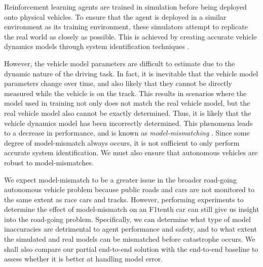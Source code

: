 

Reinforcement learning agents are trained in simulation before being deployed onto physical vehicles.
To ensure that the agent is deployed in a similar environment as its training environment, these simulators attempt to replicate the real world as closely as possible.
This is achieved by creating accurate vehicle dynamics models through system identification techniques \cite{Zhou2020}.

However, the vehicle model parameters are difficult to estimate due to the dynamic nature of the driving task.
In fact, it is inevitable that the vehicle model parameters change over time, and also likely that they cannot be directly measured while the vehicle is on the track.
This results in scenarios where the model used in training not only does not match the real vehicle model, but the real vehicle model also cannot be exactly determined.
Thus, it is likely that the vehicle dynamics model has been incorrectly determined. 
This phenomena leads to a decrease in performance, and is known as \emph{model-mismatching} \cite{Ghignone2022}.
Since some degree of model-mismatch always occurs, it is not sufficient to only perform accurate system identification.
We must also ensure that autonomous vehicles are robust to model-mismatches.

We expect model-mismatch to be a greater issue in the broader road-going autonomous vehicle problem because public roads and cars are not monitored to the same extent as race cars and tracks.
However, performing experiments to determine the effect of model-mismatch on an F1tenth car can still give us insight into the road-going problem.
Specifically, we can determine what type of model inaccuracies are detrimental to agent performance and safety, and to what extent the simulated and real models can be mismatched before catastrophe occurs.
We shall also compare our partial end-to-end solution with the end-to-end baseline to assess whether it is better at handling model error.

